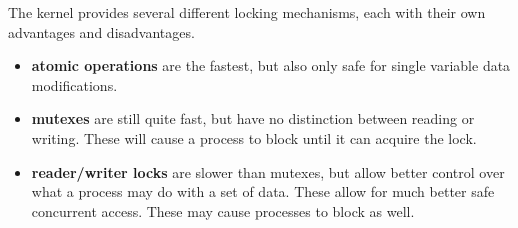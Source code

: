 
The kernel provides several different locking mechanisms, each with their own advantages
and disadvantages.
\begin{itemize}
\item \textbf{atomic operations} are the fastest, but also only safe
for single variable data modifications.
\item \textbf{mutexes} are still quite fast, but have no distinction between
reading or writing. These will cause a process to block until it can acquire the lock.
\item \textbf{reader/writer locks} are slower than mutexes, but allow better control
over what a process may do with a set of data. These allow for much better safe concurrent
access. These may cause processes to block as well.
\end{itemize}




